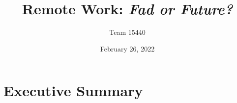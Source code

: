 \documentclass{mthree}
\author{Team 15440} %
\title{Remote Work: \textit{Fad or Future?}}
\date{February 26, 2022}
\begin{document}
    \maketitle \thispagestyle{fancy}

    
    \section{Executive Summary}
        
        
        
\end{document}

